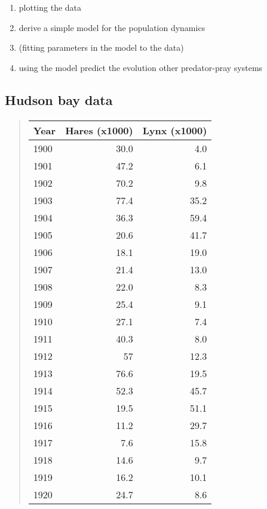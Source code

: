 \documentclass[%
twoside,                 %
final,                   %
10pt]{article}
\begin{document}
\begin{enumerate}
\item plotting the data

\item derive a simple model for the population dynamics

\item (fitting parameters in the model to the data)

\item using the model predict the evolution other predator-pray systems
\end{enumerate}

\noindent



\subsection{Hudson bay data}



\paragraph{}


\begin{quote}
\begin{tabular}{lrr}
\hline
\multicolumn{1}{c}{ Year } & \multicolumn{1}{c}{ Hares (x1000) } & \multicolumn{1}{c}{ Lynx (x1000) } \\
\hline
1900 & 30.0          & 4.0          \\
1901 & 47.2          & 6.1          \\
1902 & 70.2          & 9.8          \\
1903 & 77.4          & 35.2         \\
1904 & 36.3          & 59.4         \\
1905 & 20.6          & 41.7         \\
1906 & 18.1          & 19.0         \\
1907 & 21.4          & 13.0         \\
1908 & 22.0          & 8.3          \\
1909 & 25.4          & 9.1          \\
1910 & 27.1          & 7.4          \\
1911 & 40.3          & 8.0          \\
1912 & 57            & 12.3         \\
1913 & 76.6          & 19.5         \\
1914 & 52.3          & 45.7         \\
1915 & 19.5          & 51.1         \\
1916 & 11.2          & 29.7         \\
1917 & 7.6           & 15.8         \\
1918 & 14.6          & 9.7          \\
1919 & 16.2          & 10.1         \\
1920 & 24.7          & 8.6          \\
\hline
\end{tabular}
\end{quote}
\end{document}
